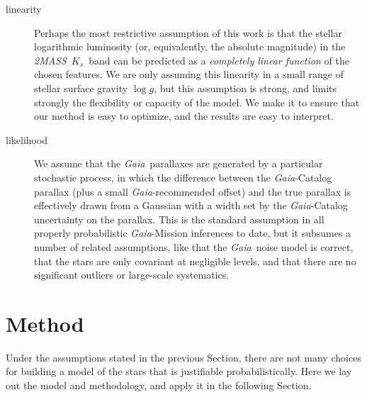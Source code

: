\documentclass[modern]{aastex62}
\newcommand{\acronym}[1]{{\small{#1}}}
\newcommand{\project}[1]{\textsl{#1}}
\newcommand{\gaia}{\project{Gaia}}
\newcommand{\zmass}{\project{\acronym{2MASS}}}
\newcommand{\logg}{\log g}
\begin{document}
\begin{description}
\item[linearity] Perhaps the most restrictive assumption of this work is that
the stellar logarithmic luminosity (or, equivalently, the absolute magnitude) in
the \zmass\ $K_s$~band can be predicted as a \emph{completely linear function} of
the chosen features. We are only assuming this linearity in a small range of stellar
surface gravity $\logg$, but this assumption is strong, and limits strongly the
flexibility or capacity of the model.
We make it to ensure that our method is easy to optimize, and the results are easy
to interpret.

\item[likelihood] We assume that the \gaia\ parallaxes are generated by a particular
stochastic process, in which the difference between the \gaia-Catalog parallax (plus
a small \gaia-recommended offset) and the true parallax is effectively drawn from a
Gaussian with a width set by the \gaia-Catalog uncertainty on the parallax.
This is the standard assumption in all properly probabilistic \gaia-Mission inferences
to date, but it subsumes a number of related assumptions, like that the \gaia\ noise
model is correct, that the stars are only covariant at negligible levels, and that
there are no significant outliers or large-scale systematics.
\end{description}

\section{Method}

Under the assumptions stated in the previous Section, there are not many choices
for building a model of the stars that is justifiable probabilistically.
Here we lay out the model and methodology, and apply it in the following Section.
\end{document}
